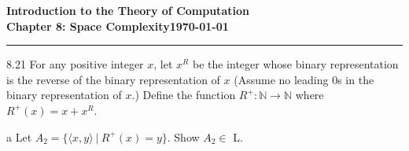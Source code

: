 \documentclass[11pt]{article}
\newcommand{\dated}{\today}
\begin{document}
\textbf{Introduction to the Theory of
Computation}\hfill\textbf{\myname}\\[0.01in]
\textbf{Chapter 8: Space Complexity}\hfill\textbf{\dated}\\
\smallskip\hrule\bigskip

\begin{problem}{8.21}
For any positive integer $x$, let $x^R$ be the integer whose binary representation is the reverse of the binary representation of $x$ (Assume no leading 0s in the binary representation of $x$.) Define the function $R^+ : \mathbb{N} \longrightarrow \mathbb{N}$ where $R^{+}(x) = x + x^{R}$.
\end{problem}

\begin{problem}[Part]{a}
Let $A_2 = \{\langle x, y \rangle \ | \ R^+(x) = y\}$. Show $A_2 \in$ L.
\end{problem}
\end{document}
